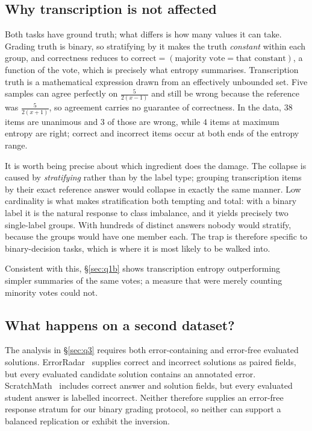 \documentclass[10pt,twocolumn,letterpaper]{article}
\begin{document}
\subsection{Why transcription is not affected}
\label{sec:whyperception}
Both tasks have ground truth; what differs is how many values it can take.
Grading truth is binary, so stratifying by it makes the truth
\emph{constant} within each group, and correctness reduces to
$\text{correct} = (\text{majority vote} = \text{that constant})$, a
function of the vote, which is precisely what entropy summarises.
Transcription truth is a mathematical expression drawn from an effectively
unbounded set. Five samples can agree perfectly on
$\frac{5}{2(x-1)}$ and still be wrong because the reference was
$\frac{5}{2(x+1)}$, so agreement carries no guarantee of correctness. In
the data, $38$ items are unanimous and $3$ of those are wrong, while $4$
items at maximum entropy are right; correct and incorrect items occur at
both ends of the entropy range.

It is worth being precise about which ingredient does the damage. The
collapse is caused by \emph{stratifying} rather than by the label type;
grouping transcription items by their exact reference answer would
collapse in exactly the same manner. Low cardinality is what makes stratification both
tempting and total: with a binary label it is the natural response to class
imbalance, and it yields precisely two single-label groups. With
hundreds of distinct answers nobody would stratify, because the groups
would have one member each. The trap is therefore specific to
binary-decision tasks, which is where it is most likely to be walked into.

Consistent with this, \S\ref{sec:q1b} shows transcription entropy
outperforming simpler summaries of the same votes; a measure that were
merely counting minority votes could not.

\subsection{What happens on a second dataset?}
\label{sec:q5}
The analysis in \S\ref{sec:q3} requires both error-containing and
error-free evaluated solutions. ErrorRadar~\cite{errorradar} supplies
correct and incorrect solutions as paired fields, but every evaluated
candidate solution contains an annotated error.
ScratchMath~\cite{scratchmath} includes correct answer and solution fields,
but every evaluated student answer is labelled incorrect. Neither
therefore supplies an error-free response stratum for our binary grading protocol, so neither
can support a balanced replication or exhibit the inversion.
\end{document}
